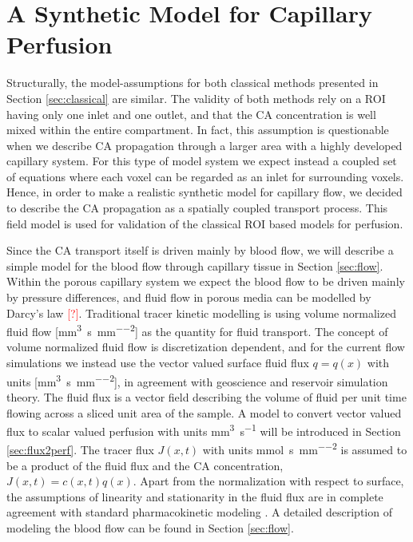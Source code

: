 \documentclass[paper=a4, fontsize=11pt,parskip=half,headings=small]{scrartcl}
\newcommand{\siq}{\milli\meter\cubed\per\second\per\milli\meter\squared}
\newcommand{\siP}{\milli\meter\cubed\per\second}
\newcommand{\siJ}{\milli\mol\per\second\per\milli\meter\squared}
\newcommand{\missingsource}{\textcolor{red}{[?]}}
\begin{document}
	\section{A Synthetic Model for Capillary Perfusion}\label{sec:synthetic}
	
	Structurally, the model-assumptions for both classical methods presented in Section \ref{sec:classical} are similar.
	The validity of both methods rely on a ROI having only one inlet and one outlet, and that the CA concentration is well mixed within the entire compartment.
	In fact, this assumption is questionable when we describe CA propagation through a larger area with a highly developed capillary system.
	For this type of model system we expect instead a coupled set of equations where each voxel can be regarded as an inlet for surrounding voxels.
	Hence, in order to make a realistic synthetic model for capillary flow, we decided to describe the CA propagation as a spatially coupled transport process. This field model is used for validation of the classical ROI based models for perfusion. 
	
	Since the CA transport itself is driven mainly by blood flow, we will describe a simple model for the blood flow through capillary tissue in Section \ref{sec:flow}.
	Within the porous capillary system we expect the blood flow to be driven mainly by pressure differences, and
	fluid flow in porous media can be modelled by Darcy's law \missingsource. Traditional tracer kinetic modelling is using volume normalized fluid flow [\si{\siq}] as the quantity for fluid transport. 
	The concept of volume normalized fluid flow is discretization dependent, and for the current flow simulations we instead use the vector valued surface fluid flux $q = q(x)$ with units [\si{\siq}], in agreement with geoscience and reservoir simulation theory.
	The fluid flux is a vector field describing the volume of fluid per unit time flowing across a sliced unit area of the sample.	
	A model to convert vector valued flux to scalar valued perfusion with units \si{\siP} will be introduced in Section \ref{sec:flux2perf}.
	The tracer flux $J(x,t)$ with units \si{\siJ} is assumed to be a product of the fluid flux and the CA concentration, $J(x,t) = c(x,t)q(x)$.
	Apart from the normalization with respect to surface, the assumptions of linearity and stationarity in the fluid flux are in complete agreement with standard pharmacokinetic modeling \cite{sourbron13}.
	A detailed description of modeling the blood flow can be found in Section \ref{sec:flow}.
	
\end{document}
